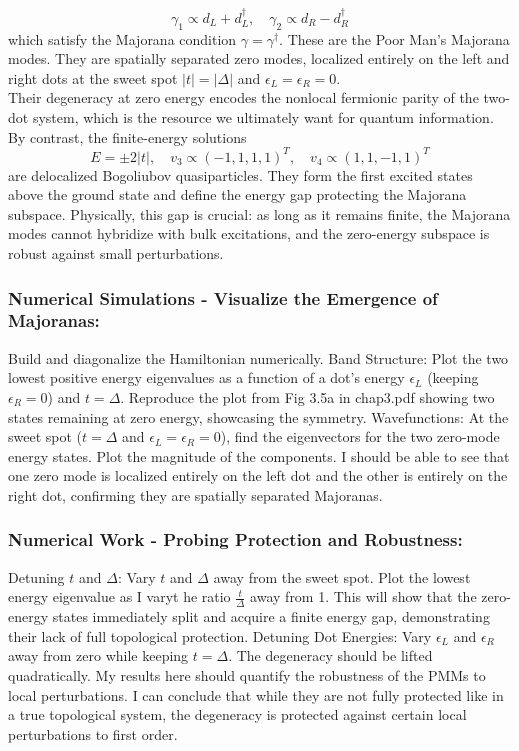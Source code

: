 \documentclass[11pt, letterpaper, titlepage]{article}
\begin{document}
$$
γ_1 ∝ d_L + d_L^{†}, \quad γ_2 ∝ d_R - d_R^{†}
$$
which satisfy the Majorana condition $γ = γ^{†}$. These are the Poor Man's Majorana modes. They are spatially separated zero modes, localized entirely on the left and right dots at the sweet spot $|t| = |Δ|$ and $ϵ_L = ϵ_R = 0$.\\
Their degeneracy at zero energy encodes the nonlocal fermionic parity of the two-dot system, which is the resource we ultimately want for quantum information.\\ 
By contrast, the finite-energy solutions 
$$E = ±2|t|, \quad v_3 ∝ (-1, 1, 1, 1)^T, \quad v_4 ∝ (1, 1, -1, 1)^T$$
are delocalized Bogoliubov quasiparticles. They form the first excited states above the ground state and define the energy gap protecting the Majorana subspace. Physically, this gap is crucial: as long as it remains finite, the Majorana modes cannot hybridize with bulk excitations, and the zero-energy subspace is robust against small perturbations. 

\subsubsection{Numerical Simulations - Visualize the Emergence of Majoranas:} Build and diagonalize the Hamiltonian numerically. Band Structure: Plot the two lowest positive energy eigenvalues as a function of a dot's energy $ϵ_L$ (keeping $ϵ_R = 0$) and $t = Δ$. Reproduce the plot from Fig 3.5a in chap3.pdf showing two states remaining at zero energy, showcasing the symmetry. Wavefunctions: At the sweet spot ($t = Δ$ and $ϵ_L = ϵ_R = 0$), find the eigenvectors for the two zero-mode energy states. Plot the magnitude of the components. I should be able to see that one zero mode is localized entirely on the left dot and the other is entirely on the right dot, confirming they are spatially separated Majoranas.\par
\subsubsection{Numerical Work - Probing Protection and Robustness:} Detuning $t$ and $Δ$: Vary $t$ and $Δ$ away from the sweet spot. Plot the lowest energy eigenvalue as I varyt he ratio $\frac{t}{Δ}$ away from 1. This will show that the zero-energy states immediately split and acquire a finite energy gap, demonstrating their lack of full topological protection. Detuning Dot Energies: Vary $ϵ_L$ and $ϵ_R$ away from zero while keeping $t = Δ$. The degeneracy should be lifted quadratically. My results here should quantify the robustness of the PMMs to local perturbations. I can conclude that while they are not fully protected like in a true topological system, the degeneracy is protected against certain local perturbations to first order.\par
\end{document}
